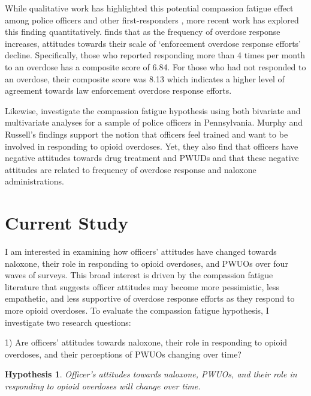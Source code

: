 While qualitative work has highlighted this potential compassion fatigue effect among police officers and other first-responders \parencite{banta-green_police_2013, saunders_you_2019}, more recent work has explored this finding quantitatively. \textcite{carroll_knowledge_2020} finds that as the frequency of overdose response increases, attitudes towards their scale of ‘enforcement overdose response efforts’ decline. Specifically, those who reported responding more than 4 times per month to an overdose has a composite score of 6.84. For those who had not responded to an overdose, their composite score was 8.13 which indicates a higher level of agreement towards law enforcement overdose response efforts. 

Likewise, \textcite{murphy_police_2020} investigate the compassion fatigue hypothesis using both bivariate and multivariate analyses for a sample of police officers in Pennsylvania. Murphy and Russell’s findings support the notion that officers feel trained and want to be involved in responding to opioid overdoses. Yet, they also find that officers have negative attitudes towards drug treatment and PWUDs and that these negative attitudes are related to frequency of overdose response and naloxone administrations. 

\section{Current Study}

I am interested in examining how officers’ attitudes have changed towards naloxone, their role in responding to opioid overdoses, and PWUOs over four waves of surveys. This broad interest is driven by the compassion fatigue literature that suggests officer attitudes may become more pessimistic, less empathetic, and less supportive of overdose response efforts as they respond to more opioid overdoses. To evaluate the compassion fatigue hypothesis, I investigate two research questions:

1) Are officers’ attitudes towards naloxone, their role in responding to opioid overdoses, and their perceptions of PWUOs changing over time? 

\newtheorem{hypothesis}{Hypothesis}

\begin{hypothesis} 
Officer's attitudes towards naloxone, PWUOs, and their role in responding to opioid overdoses will change over time.
\end{hypothesis}


